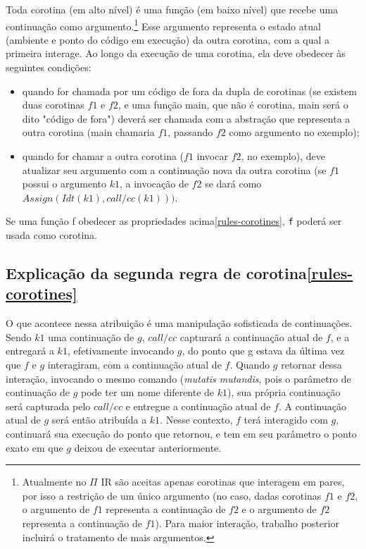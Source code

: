 Toda corotina (em alto nível) é uma função (em baixo nível) que recebe uma continuação como argumento.\footnote{Atualmente no $\Pi$ IR são aceitas apenas corotinas que interagem em pares, por isso a restrição de um único argumento (no caso, dadas corotinas $\mathit{f1}$ e $\mathit{f2}$, o argumento de $\mathit{f1}$ representa a continuação de $\mathit{f2}$ e o argumento de $\mathit{f2}$ representa a continuação de $\mathit{f1}$). Para maior interação, trabalho posterior incluirá o tratamento de mais argumentos.} 
Esse argumento representa o estado atual (ambiente e ponto do código em execução) da outra corotina, com a qual a primeira interage. Ao longo da execução de uma corotina, ela deve obedecer às seguintes condições\label{rules-corotines}:
\begin{itemize}
    \item quando for chamada por um código de fora da dupla de corotinas (se existem duas corotinas $\mathit{f1}$ e $\mathit{f2}$, e uma função main, que não é corotina, main será o dito "código de fora") deverá ser chamada com a abstração que representa a outra corotina (main chamaria $\mathit{f1}$, passando $\mathit{f2}$ como argumento no exemplo);
    \item quando for chamar a outra corotina ($\mathit{f1}$ invocar $\mathit{f2}$, no exemplo), deve atualizar seu argumento com a continuação nova da outra corotina (se $\mathit{f1}$ possui o argumento $\mathit{k1}$, a invocação de $\mathit{f2}$ se dará como $Assign(Idt(k1), call/cc(k1)) )$.
\end{itemize}

Se uma função f obedecer as propriedades acima\ref{rules-corotines}, \texttt{f} poderá ser usada como corotina.

\subsection{Explicação da segunda regra de corotina\ref{rules-corotines}}
O que acontece nessa atribuição é uma manipulação sofisticada de continuações. Sendo \texttt{$\mathit{k1}$} uma continuação de $g$, $\mathit{call/cc}$ capturará a continuação atual de $f$, e a entregará a $\mathit{k1}$, efetivamente invocando $g$, do ponto que g estava da última vez que $f$ e $g$ interagiram, com a continuação atual de $f$. Quando $g$ retornar dessa interação, invocando o mesmo comando (\textit{mutatis mutandis}, pois o parâmetro de continuação de $g$ pode ter um nome diferente de $\mathit{k1}$), sua própria continuação será capturada pelo $\mathit{call/cc}$ e entregue a continuação atual de $f$. A continuação atual de $g$ será então atribuída a $\mathit{k1}$. Nesse contexto, $f$ terá interagido com $g$, continuará sua execução do ponto que retornou, e tem em seu parâmetro o ponto exato em que $g$ deixou de executar anteriormente.

